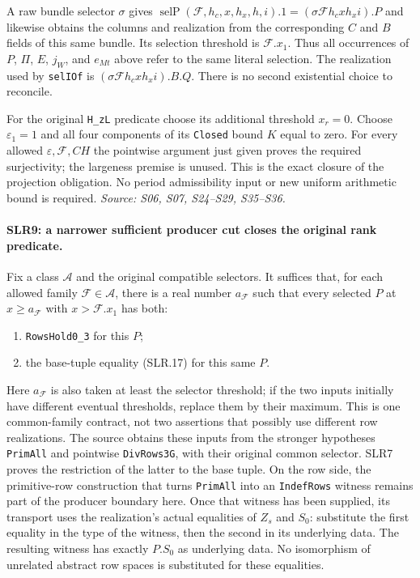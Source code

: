 A raw bundle selector $\sigma$ gives
$\operatorname{selP}(\mathcal F,h_c,x,h_x,h,i).1
=(\sigma\mathcal F h_c x h_x i).P$ and likewise obtains the columns
and realization from the corresponding $C$ and $B$ fields of this
same bundle.  Its selection threshold is $\mathcal F.x_1$.
Thus all occurrences of $P$, $\Pi$, $E$, $j_W$, and $e_{Mt}$ above
refer to the same literal selection.  The realization used by
\texttt{selIOf} is $(\sigma\mathcal F h_c x h_x i).B.Q$.
There is no second existential choice to reconcile.

For the original \texttt{H\_zL} predicate choose its additional
threshold $x_r=0$.  Choose $\varepsilon_1=1$ and all four components
of its \texttt{Closed} bound $K$ equal to zero.  For every allowed
$\varepsilon,\mathcal F,CH$ the pointwise argument just given proves
the required surjectivity; the largeness premise is unused.  This is
the exact closure of the projection obligation.  No period
admissibility input or new uniform arithmetic bound is required.
\emph{Source: S06, S07, S24--S29, S35--S36.}

\paragraph{SLR9: a narrower sufficient producer cut closes the original rank predicate.}
\label{claim:SLR9}
Fix a class $\mathcal A$ and the original compatible selectors.  It
suffices that, for each allowed family $\mathcal F\in\mathcal A$,
there is a real number $a_{\mathcal F}$ such that every selected
$P$ at $x\ge a_{\mathcal F}$ with $x>\mathcal F.x_1$ has both:
\begin{enumerate}
\item \texttt{RowsHold0\_3} for this $P$;
\item the base-tuple equality (SLR.17) for this same $P$.
\end{enumerate}
Here $a_{\mathcal F}$ is also taken at least the selector threshold;
if the two inputs initially have different eventual thresholds,
replace them by their maximum.  This is one common-family contract,
not two assertions that possibly use different row realizations.
The source obtains these inputs from the stronger hypotheses
\texttt{PrimAll} and pointwise \texttt{DivRows3G}, with their original
common selector.  SLR7 proves the restriction of the latter to the
base tuple.  On the row side, the primitive-row construction that turns
\texttt{PrimAll} into an \texttt{IndefRows} witness remains part of
the producer boundary here.  Once that witness has been supplied, its
transport uses the realization's actual equalities of $Z_s$ and $S_0$:
substitute the first equality in the type of the witness, then the
second in its underlying data.  The resulting witness has exactly
$P.S_0$ as underlying data.  No isomorphism of unrelated abstract row
spaces is substituted for these equalities.

